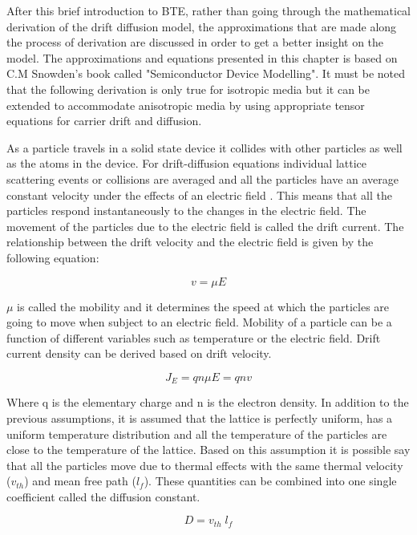 \begin{doublespace}
After this brief introduction to BTE, rather than going through the mathematical derivation of the drift diffusion model, the approximations that are made along the process of derivation are discussed in order to get a better insight on the model. The approximations and equations presented in this chapter is based on C.M Snowden's book called "Semiconductor Device Modelling"\cite{snowden}. It must be noted that the following derivation is only true for isotropic media but it can be extended to accommodate anisotropic media by using appropriate tensor equations for carrier drift and diffusion.

As a particle travels in a solid state device it collides with other particles as well as the atoms in the device. For drift-diffusion equations individual lattice scattering events or collisions are averaged and all the particles have an average constant velocity under the effects of an electric field \cite{snowden}. This means that all the particles respond instantaneously to the changes in the electric field. The movement of the particles due to the electric field is called the drift current. The relationship between the drift velocity and the electric field is given by the following equation:

\begin{equation}
v=\mu E
\end{equation}

$\mu$ is called the mobility and it determines the speed at which the particles are going to move when subject to an electric field. Mobility of a particle can be a function of different variables such as temperature or the electric field. Drift current density can be derived based on drift velocity\cite{snowden}.

\begin{equation}
J_E=q n\mu E=q n v 
\end{equation}

Where q is the elementary charge and n is the electron density. In addition to the previous assumptions, it is assumed that the lattice is perfectly uniform, has a uniform temperature distribution and all the temperature of the particles are close to the temperature of the lattice. Based on this assumption it is possible say that all the particles move due to thermal effects with the same thermal velocity ($v_{th}$) and mean free path ($l_f$). These quantities can be combined into one single coefficient called the diffusion constant. 

\begin{equation}
D=v_{th} \;l_f
\end{equation}


\end{doublespace}
